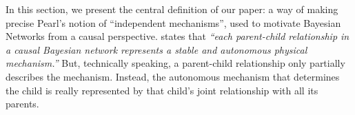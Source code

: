 In this section, we present the central definition of our paper: a way of making precise
Pearl's notion of ``independent mechanisms'', used to motivate Bayesian Networks from a causal perspective. 
%
%
states that
    \textit{%
    ``each parent-child relationship in a causal Bayesian network represents a
    stable and autonomous physical mechanism.''
    }%
%
But, technically speaking,
a parent-child relationship only partially describes
the mechanism.  Instead, the autonomous mechanism that determines the child is really represented by that child's joint relationship with all its parents.
